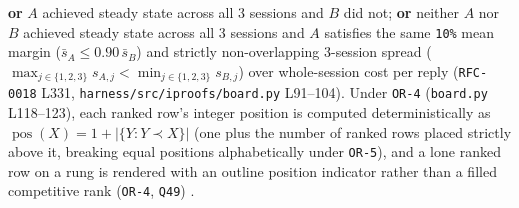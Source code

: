 \documentclass[11pt,letterpaper]{article}
\begin{document}
\textbf{or} $A$ achieved steady state across all 3 sessions and $B$ did not; \textbf{or} neither $A$ nor $B$ achieved steady state across all 3 sessions and $A$ satisfies the same \texttt{10\%} mean margin ($\bar{s}_A \le 0.90\,\bar{s}_B$) and strictly non-overlapping 3-session spread ($\max_{j \in \{1,2,3\}} s_{A,j} < \min_{j \in \{1,2,3\}} s_{B,j}$) over whole-session cost per reply (\texttt{RFC-0018} L331, \texttt{harness/\allowbreak{}src/\allowbreak{}iproofs/\allowbreak{}board.\allowbreak{}py} L91--104). Under \texttt{OR-4} (\texttt{board.\allowbreak{}py} L118--123), each ranked row's integer position is computed deterministically as $\operatorname{pos}(X) = 1 + |\{Y : Y \prec X\}|$ (one plus the number of ranked rows placed strictly above it, breaking equal positions alphabetically under \texttt{OR-5}), and a lone ranked row on a rung is rendered with an outline position indicator rather than a filled competitive rank (\texttt{OR-4}, \texttt{Q49}) \cite{iproofs2026}.
\end{document}
